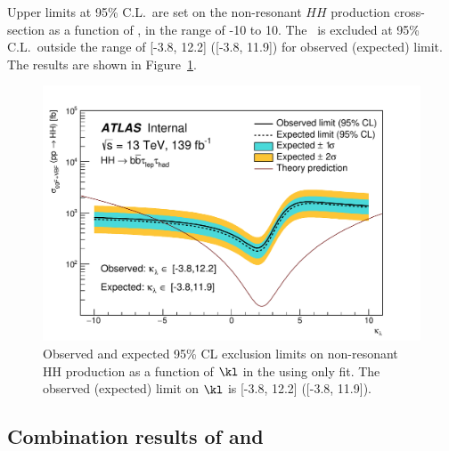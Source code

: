 





Upper limits at 95\% C.L.\ are set on the non-resonant $HH$ production cross-section as a function of \kl,
in the range of -10 to 10.
The \kl\ is excluded at 95\% C.L.\ outside the range of [-3.8, 12.2] ([-3.8, 11.9]) for observed (expected) limit.
The results are shown in  Figure~\ref{fig:bbtautau_subklscans}.


\begin{figure}[htbp]
\begin{center}
    \includegraphics[width=.8\textwidth]{DiHiggs/plots/kl_scan/bbtautauSubchannels/bbtautau_lephad_kl_scan.pdf}
\end{center}
\caption{Observed and expected 95\% CL exclusion limits on non-resonant 
HH production as a function of $\kl$ in the 
using \lephad only fit.
The observed (expected) limit on $\kl$ is 
[-3.8, 12.2] ([-3.8, 11.9]).}
\label{fig:bbtautau_subklscans}
\end{figure}


\newpage

\subsection{Combination results of  \texorpdfstring{\lephad and \hadhad}{lephad and hadhad}}

